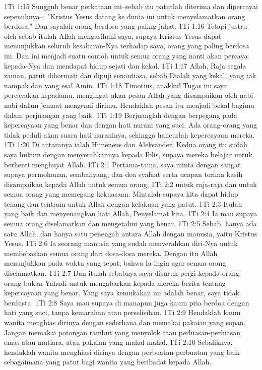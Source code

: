 1Ti 1:15  Sungguh benar perkataan ini--sebab itu patutlah diterima dan dipercayai sepenuhnya--: "Kristus Yesus datang ke dunia ini untuk menyelamatkan orang berdosa." Dan sayalah orang berdosa yang paling jahat.
1Ti 1:16  Tetapi justru oleh sebab itulah Allah mengasihani saya, supaya Kristus Yesus dapat menunjukkan seluruh kesabaran-Nya terhadap saya, orang yang paling berdosa ini. Dan ini menjadi suatu contoh untuk semua orang yang nanti akan percaya kepada-Nya dan mendapat hidup sejati dan kekal.
1Ti 1:17  Allah, Raja segala zaman, patut dihormati dan dipuji senantiasa, sebab Dialah yang kekal, yang tak nampak dan yang esa! Amin.
1Ti 1:18  Timotius, anakku! Tugas ini saya percayakan kepadamu, mengingat akan pesan Allah yang disampaikan oleh nabi-nabi dalam jemaat mengenai dirimu. Hendaklah pesan itu menjadi bekal bagimu dalam perjuangan yang baik.
1Ti 1:19  Berjuanglah dengan berpegang pada kepercayaan yang benar dan dengan hati nurani yang suci. Ada orang-orang yang tidak peduli akan suara hati nuraninya, sehingga hancurlah kepercayaan mereka.
1Ti 1:20  Di antaranya ialah Himeneus dan Aleksander. Kedua orang itu sudah saya hukum dengan menyerahkannya kepada Iblis, supaya mereka belajar untuk berhenti menghujat Allah.
1Ti 2:1  Pertama-tama, saya minta dengan sangat supaya permohonan, sembahyang, dan doa syafaat serta ucapan terima kasih disampaikan kepada Allah untuk semua orang;
1Ti 2:2  untuk raja-raja dan untuk semua orang yang memegang kekuasaan. Mintalah supaya kita dapat hidup tenang dan tentram untuk Allah dengan kelakuan yang patut.
1Ti 2:3  Itulah yang baik dan menyenangkan hati Allah, Penyelamat kita.
1Ti 2:4  Ia mau supaya semua orang diselamatkan dan mengetahui yang benar.
1Ti 2:5  Sebab, hanya ada satu Allah, dan hanya satu penengah antara Allah dengan manusia, yaitu Kristus Yesus.
1Ti 2:6  Ia seorang manusia yang sudah menyerahkan diri-Nya untuk membebaskan semua orang dari dosa-dosa mereka. Dengan itu Allah menunjukkan pada waktu yang tepat, bahwa Ia ingin agar semua orang diselamatkan.
1Ti 2:7  Dan itulah sebabnya saya disuruh pergi kepada orang-orang bukan Yahudi untuk mengabarkan kepada mereka berita tentang kepercayaan yang benar. Yang saya kemukakan ini adalah benar, saya tidak berdusta.
1Ti 2:8  Saya mau supaya di manapun juga kaum pria berdoa dengan hati yang suci, tanpa kemarahan atau perselisihan.
1Ti 2:9  Hendaklah kaum wanita menghias dirinya dengan sederhana dan memakai pakaian yang sopan. Jangan memakai potongan rambut yang menyolok atau perhiasan-perhiasan emas atau mutiara, atau pakaian yang mahal-mahal.
1Ti 2:10  Sebaliknya, hendaklah wanita menghiasi dirinya dengan perbuatan-perbuatan yang baik sebagaimana yang patut bagi wanita yang beribadat kepada Allah.
